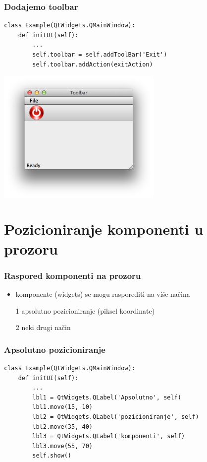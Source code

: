\documentclass[utf8,compress,aspectratio=169]{beamer}
\begin{document}
\begin{frame}[fragile]
  \frametitle{Dodajemo toolbar}
\begin{verbatim}
class Example(QtWidgets.QMainWindow):
    def initUI(self):
        ...
        self.toolbar = self.addToolBar('Exit')
        self.toolbar.addAction(exitAction)
\end{verbatim}
\begin{center}
\includegraphics[width=8cm]{pyqt04.png}
\end{center}
\end{frame}

\section[Pozicioniranje]{Pozicioniranje komponenti u prozoru}

\begin{frame}[fragile]
  \frametitle{Raspored komponenti na prozoru}
  \begin{itemize}
    \item komponente (widgets) se mogu rasporediti na više načina
    \item[1] apsolutno pozicioniranje (piksel koordinate)
    \item[2] neki drugi način
  \end{itemize}
\end{frame}

\begin{frame}[fragile]
  \frametitle{Apsolutno pozicioniranje}
\begin{verbatim}
class Example(QtWidgets.QMainWindow):
    def initUI(self):
        ...
        lbl1 = QtWidgets.QLabel('Apsolutno', self)
        lbl1.move(15, 10)
        lbl2 = QtWidgets.QLabel('pozicioniranje', self)
        lbl2.move(35, 40)
        lbl3 = QtWidgets.QLabel('komponenti', self)
        lbl3.move(55, 70)
        self.show()
\end{verbatim}
\end{frame}
\end{document}
